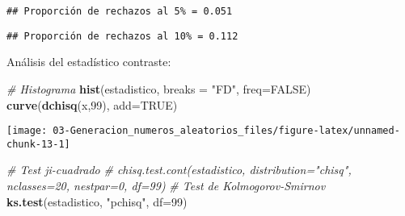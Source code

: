 \documentclass[
]{book}
\newenvironment{Shaded}{\begin{snugshade}}{\end{snugshade}}
\newcommand{\CharTok}[1]{\textcolor[rgb]{0.31,0.60,0.02}{#1}}
\newcommand{\CommentTok}[1]{\textcolor[rgb]{0.56,0.35,0.01}{\textit{#1}}}
\newcommand{\DataTypeTok}[1]{\textcolor[rgb]{0.13,0.29,0.53}{#1}}
\newcommand{\DecValTok}[1]{\textcolor[rgb]{0.00,0.00,0.81}{#1}}
\newcommand{\FloatTok}[1]{\textcolor[rgb]{0.00,0.00,0.81}{#1}}
\newcommand{\KeywordTok}[1]{\textcolor[rgb]{0.13,0.29,0.53}{\textbf{#1}}}
\newcommand{\NormalTok}[1]{#1}
\newcommand{\OperatorTok}[1]{\textcolor[rgb]{0.81,0.36,0.00}{\textbf{#1}}}
\newcommand{\OtherTok}[1]{\textcolor[rgb]{0.56,0.35,0.01}{#1}}
\newcommand{\StringTok}[1]{\textcolor[rgb]{0.31,0.60,0.02}{#1}}
\theoremstyle{break}
\theoremstyle{definition}
\theoremstyle{definition}
\theoremstyle{definition}
\theoremstyle{remark}
\begin{document}
\begin{Shaded}
\end{Shaded}

\begin{verbatim}
## Proporción de rechazos al 5% = 0.051
\end{verbatim}

\begin{Shaded}
\end{Shaded}

\begin{verbatim}
## Proporción de rechazos al 10% = 0.112
\end{verbatim}

Análisis del estadístico contraste:

\begin{Shaded}
\begin{Highlighting}[]
\CommentTok{# Histograma}
\KeywordTok{hist}\NormalTok{(estadistico, }\DataTypeTok{breaks =} \StringTok{"FD"}\NormalTok{, }\DataTypeTok{freq=}\OtherTok{FALSE}\NormalTok{)}
\KeywordTok{curve}\NormalTok{(}\KeywordTok{dchisq}\NormalTok{(x,}\DecValTok{99}\NormalTok{), }\DataTypeTok{add=}\OtherTok{TRUE}\NormalTok{)}
\end{Highlighting}
\end{Shaded}

\begin{center}\texttt{[image: 03-Generacion\_numeros\_aleatorios\_files/figure-latex/unnamed-chunk-13-1]} \end{center}

\begin{Shaded}
\begin{Highlighting}[]
\CommentTok{# Test ji-cuadrado}
\CommentTok{# chisq.test.cont(estadistico, distribution="chisq", nclasses=20, nestpar=0, df=99)}
\CommentTok{# Test de Kolmogorov-Smirnov}
\KeywordTok{ks.test}\NormalTok{(estadistico, }\StringTok{"pchisq"}\NormalTok{, }\DataTypeTok{df=}\DecValTok{99}\NormalTok{)}
\end{Highlighting}
\end{Shaded}
\end{document}
